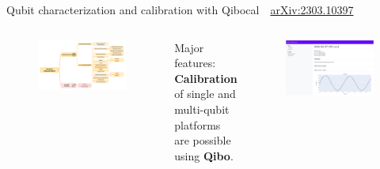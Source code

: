 \documentclass[aspectratio=169, 10pt, xcolor={svgnames}, hyperref={linkcolor=black}]{beamer}
\begin{document}
 \begin{frame}{Qubit characterization and calibration with Qibocal \hfill \faBook\,\, \href{https://arxiv.org/abs/2303.10397}{arXiv:2303.10397}}

   \begin{columns}
     \column{9cm}

   \begin{figure}
     \includegraphics[width=\textwidth]{figures/qpu_characterization.pdf}
   \end{figure}

     \column{6cm}
     \begin{exampleblock}{Major features:}
       \textbf{Calibration} of single and multi-qubit platforms are possible using \textbf{Qibo}.
     \end{exampleblock}
     \begin{figure}
       \includegraphics[width=\textwidth]{figures/qibocal_report.png}
     \end{figure}
   \end{columns}

 \end{frame}
\end{document}
